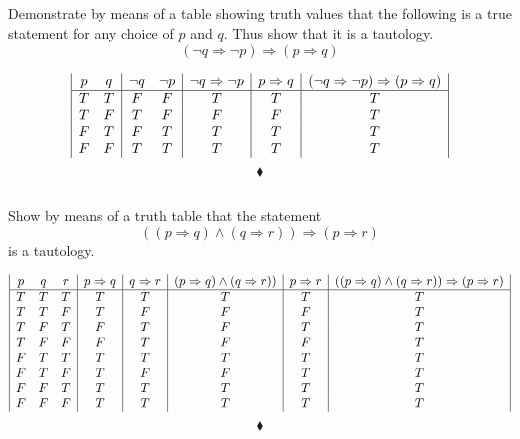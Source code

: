 \subsection{}
\begin{tcolorbox}
Demonstrate by means of a table showing truth values that the following is a true statement for any choice of $p$ and $q$. Thus show that it is a tautology.
$$(\lnot q\Rightarrow \lnot p)\Rightarrow ( p \Rightarrow q)$$
\end{tcolorbox}
\begin{displaymath}
\begin{array}{|c c|c c|c|c|c|}
p & q &\lnot q &\lnot p &\lnot q\Rightarrow \lnot p& p\Rightarrow q&(\lnot q\Rightarrow \lnot p)\Rightarrow ( p \Rightarrow q) \\ %
\hline %
T & T &F&F& T&T&T\\
T & F &T&F& F&F&T\\
F & T &F&T& T&T&T\\
F & F &T&T& T&T&T\\
\end{array}
\end{displaymath}
$$\blacklozenge$$

\subsection{}
\begin{tcolorbox}
Show by means of a truth table  that the statement 
$$((p\Rightarrow q) \wedge (q\Rightarrow r))\Rightarrow (p\Rightarrow r)$$
is a tautology.
\end{tcolorbox}
\begin{displaymath}
\begin{array}{|c c c|c| c|c|c|c|}
p & q &r & p\Rightarrow q &q\Rightarrow r &(p\Rightarrow q) \wedge (q\Rightarrow r))& p\Rightarrow r&((p\Rightarrow q) \wedge (q\Rightarrow r))\Rightarrow (p\Rightarrow r)\\ %
\hline 
T & T &T&T&T& T&T&T\\
T & T &F&T&F& F&F&T\\
T & F &T&F&T& F&T&T\\
T & F &F&F&T& F&F&T\\
F & T &T&T&T& T&T&T\\
F & T &F&T&F& F&T&T\\
F & F &T&T&T& T&T&T\\
F & F &F&T&T& T&T&T\\
\end{array}
\end{displaymath}
$$\blacklozenge$$
